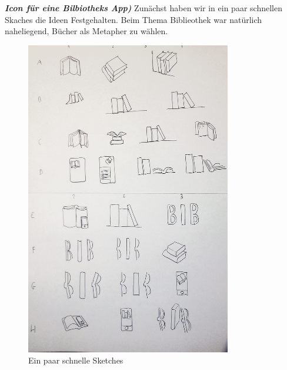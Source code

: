 \documentclass[a4paper,10pt]{article}
\begin{document}
\textbf{\textit{Icon für eine Bilbiotheks App)}} \newline
Zunächst haben wir in ein paar schnellen Skaches die Ideen Festgehalten. Beim Thema Biblieothek war natürlich naheliegend, Bücher als Metapher zu wählen.
\begin{figure}[H]
\centering \includegraphics[width=0.8\textwidth]{sketches}
\caption{Ein paar schnelle Sketches}
\end{figure}
\end{document}
